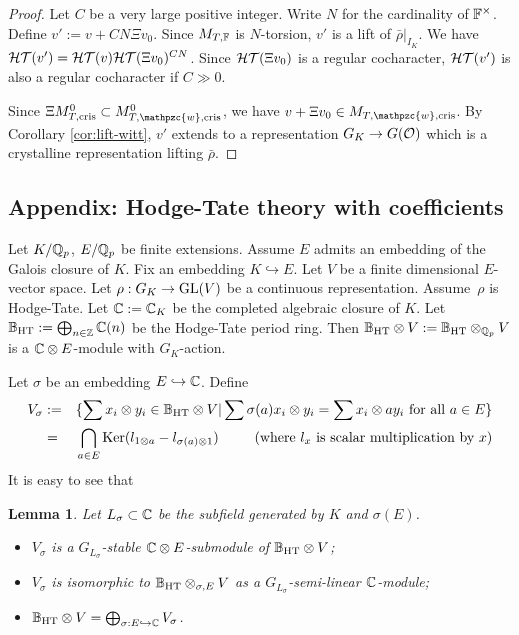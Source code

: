 \documentclass[10pt,a4paper,twoside]{article}
\newtheorem{lem}{Lemma}
\begin{document}
\begin{proof}
Let $C$ be a very large positive integer.
Write $N$ for the cardinality of ${\mathbb{F}}^\times$.
Define $v' := v + C N \Xi v_0$.
Since $M_{T, {\mathbb{F}}}$ is $N$-torsion, 
$v'$ is a lift of $\bar\rho|_{I_K}$.
We have ${\mathcal{HT}}(v') = {\mathcal{HT}}(v){\mathcal{HT}}(\Xi v_0)^{C N}$.
Since ${\mathcal{HT}}(\Xi v_0)$ is a regular cocharacter, ${\mathcal{HT}}(v')$ is also a regular cocharacter if $C \gg 0$.

Since $\Xi M_{T, \text{cris}}^0 \subset M^0_{T,\mathpzc{w},\text{cris}}$,
we have $v + \Xi v_0 \in M_{T,\mathpzc{w},\text{cris}}$.
By Corollary \ref{cor:lift-witt},
$v'$ extends to a representation $G_K\to G(\mathcal{O})$
which is a crystalline representation lifting $\bar\rho$.
\end{proof}


 
\begin{appendix}
\section{Appendix: Hodge-Tate theory with coefficients}

\label{Hodge-Tate}








Let $K/\mathbb{Q}_p$, $E/\mathbb{Q}_p$ be finite extensions.
Assume $E$ admits an embedding of the Galois closure of $K$.
Fix an embedding $K \hookrightarrow E$.
Let $V$ be a finite dimensional $E$-vector space.
Let $\rho:G_K \to \operatorname{GL}(V)$ be a continuous representation.
Assume~$\rho$ is Hodge-Tate.
Let ${\mathbb{C}} := {\mathbb{C}}_K$ be the completed algebraic closure of $K$.
Let $\mathbb{B}_{\operatorname{HT}} := \bigoplus_{n\in{\mathbb{Z}}}{\mathbb{C}}(n)$ be the Hodge-Tate period ring.
Then $\mathbb{B}_{\operatorname{HT}}\otimes V := \mathbb{B}_{\operatorname{HT}}\otimes_{\mathbb{Q}_p} V$ is a ${\mathbb{C}} \otimes E$-module
with $G_K$-action.

Let $\sigma$ be an embedding $E \hookrightarrow {\mathbb{C}}$.
Define 
\begin{eqnarray}
V_{\sigma} &:=&\{\sum x_i\otimes y_i\in \mathbb{B}_{\operatorname{HT}}\otimes V|
\sum \sigma(a) x_i\otimes y_i 
= \sum x_i \otimes a y_i \text{ for all }a\in E\}\nonumber\\
&=&\bigcap_{a\in E}\operatorname{Ker} (l_{1\otimes a} - l_{\sigma(a)\otimes 1})
\text{\hspace{9mm}(where $l_{x}$ is scalar multiplication by $x$)}
\nonumber
\end{eqnarray}
It is easy to see that 


\begin{lem}
Let $L_{\sigma}\subset {\mathbb{C}}$ be the subfield generated by $K$ and $\sigma(E)$.
\begin{itemize}
\item[(i)]
$V_{\sigma}$ is a $G_{L_{\sigma}}$-stable ${\mathbb{C}}\otimes E$-submodule
of $\mathbb{B}_{\operatorname{HT}}\otimes V$;
\item[(ii)]
$V_{\sigma}$ is isomorphic to
$\mathbb{B}_{\operatorname{HT}} \otimes_{\sigma, E} V$
as a $G_{L_{\sigma}}$-semi-linear ${\mathbb{C}}$-module;
\item[(iii)]
$\mathbb{B}_{\operatorname{HT}}\otimes V = \bigoplus_{\sigma: E\hookrightarrow {\mathbb{C}}}V_{\sigma}$.
\end{itemize}
\end{lem}


\end{appendix}
\end{document}
